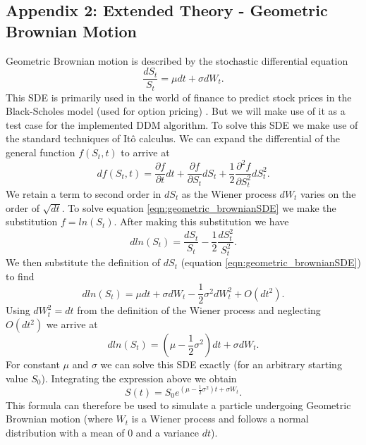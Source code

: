 \documentclass[10pt]{article}
\begin{document}
\subsection{Appendix 2: Extended Theory - Geometric Brownian Motion}
\label{section:geometric}
Geometric Brownian motion is described by the stochastic differential equation 
\begin{equation}
\label{eqn:geometric_brownianSDE}
\frac{dS_t}{S_t} = \mu dt + \sigma dW_t.
\end{equation}
This SDE is primarily used in the world of finance to predict stock prices in the Black-Scholes model (used for option pricing) \cite{sde}. But we will make use of it as a test case for the implemented DDM algorithm. To solve this SDE we make use of the standard techniques of Itô calculus. We can expand the differential of the general function $f(S_t, t)$ to arrive at
\begin{equation}
df(S_t, t) = \frac{\partial f}{\partial t} dt + \frac{\partial f}{\partial S_t} dS_t + \frac{1}{2} \frac{\partial^2 f}{\partial S_t^2} dS_t^2.
\end{equation}
We retain a term to second order in $dS_t$ as the Wiener process $dW_t$ varies on the order of $\sqrt{dt}$. To solve equation \ref{eqn:geometric_brownianSDE} we make the substitution $f = ln(S_t)$. After making this substitution we have
\begin{equation}
dln(S_t) = \frac{dS_t }{S_t} - \frac{1}{2}\frac{dS_t^2}{S_t^2}.
\end{equation}
We then substitute the definition of $dS_t$ (equation \ref{eqn:geometric_brownianSDE}) to find
\begin{equation}
dln(S_t) = \mu dt + \sigma dW_t - \frac{1}{2} \sigma^2 dW_t^2 + O(dt^2).
\end{equation}
Using $dW_t^2 = dt$ from the definition of the Wiener process and neglecting $O(dt^2)$ we arrive at
\begin{equation}
dln(S_t) = (\mu - \frac{1}{2} \sigma^2) dt + \sigma dW_t.
\end{equation}
For constant $\mu$ and $\sigma$ we can solve this SDE exactly (for an arbitrary starting value $S_0$). Integrating the expression above we obtain
\begin{equation}
\label{eqn:geometric_brownian_equation}
S(t) = S_0 e^{(\mu - \frac{1}{2} \sigma^2) t + \sigma W_t}.
\end{equation}
This formula can therefore be used to simulate a particle undergoing Geometric Brownian motion (where $W_t$ is a Wiener process and follows a normal distribution with a mean of 0 and a variance $dt$).
 
\end{document}
